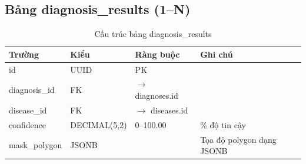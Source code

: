 \documentclass[12pt,a4paper]{article}
\begin{document}
\subsection{Bảng diagnosis\_results (1--N)}
\begin{longtable}{|l|l|l|p{6cm}|}
    \caption{Cấu trúc bảng diagnosis\_results}                                               \\
    \hline
    \rowcolor{headerblue}
    \textbf{Trường} & \textbf{Kiểu} & \textbf{Ràng buộc}         & \textbf{Ghi chú}          \\
    \hline
    id              & UUID          & PK                         &                           \\
    \hline
    diagnosis\_id   & FK            & $\rightarrow$ diagnoses.id &                           \\
    \hline
    disease\_id     & FK            & $\rightarrow$ diseases.id  &                           \\
    \hline
    confidence      & DECIMAL(5,2)  & 0--100.00                  & \% độ tin cậy             \\
    \hline
    mask\_polygon   & JSONB         &                            & Tọa độ polygon dạng JSONB \\
    \hline
\end{longtable}
\end{document}

